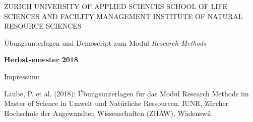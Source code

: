 
\begin{titlepage}
\begin{center}
  
{\small 
ZURICH UNIVERSITY OF APPLIED SCIENCES
\linebreak SCHOOL OF LIFE SCIENCES AND FACILITY MANAGEMENT
\linebreak INSTITUTE OF NATURAL RESOURCE SCIENCES
}

\end{center}
\vspace{1.5cm}
\begin{center}

{\Large Übungsunterlagen und Demoscript zum Modul \emph{Research Methods}}

\end{center}
 \vspace{1cm}


\begin{center}
\textbf{Herbstsemester 2018}


\end{center} 

\vspace{1.0cm}


\newpage
\thispagestyle{empty}
\begin{minipage}{15cm}
\begin{flushleft}




\vspace{18cm}
{\large Impressum:}

\vspace{0.5cm}

Laube, P. et al. (2018): Übungsunterlagen für das Modul Research Methods im Master of Science in Umwelt und Natürliche Ressourcen. IUNR, Zürcher Hochschule der Angewandten Wissenschaften (ZHAW), W{\"a}denswil.

\end{flushleft}
\end{minipage}

\end{titlepage}
\restoregeometry
